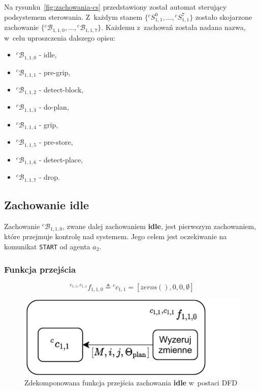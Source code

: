 Na rysunku~\ref{fig:zachowania-cs} przedstawiony został automat sterujący podsystemem sterowania. Z~każdym stanem $\{ {}^{c}S_{1,1}^0, \hdots, {}^{c}S_{1,1}^7 \}$ zostało skojarzone zachowanie $\{ {}^{c}\mathcal{B}_{1,1,0}, \hdots, {}^{c}\mathcal{B}_{1,1,7} \}$. Każdemu z~zachowań została nadana nazwa, w~celu uproszczenia dalszego opisu:
\begin{itemize}
    \item ${}^{c}\mathcal{B}_{1,1,0}$ - idle,
    \item ${}^{c}\mathcal{B}_{1,1,1}$ - pre-grip,
    \item ${}^{c}\mathcal{B}_{1,1,2}$ - detect-block,
    \item ${}^{c}\mathcal{B}_{1,1,3}$ - do-plan,
    \item ${}^{c}\mathcal{B}_{1,1,4}$ - grip,
    \item ${}^{c}\mathcal{B}_{1,1,5}$ - pre-store,
    \item ${}^{c}\mathcal{B}_{1,1,6}$ - detect-place,
    \item ${}^{c}\mathcal{B}_{1,1,7}$ - drop.
\end{itemize}

\subsection{Zachowanie idle}
\label{subsec:cs-idle}

Zachowanie ${}^{c}\mathcal{B}_{1,1,0}$, zwane dalej zachowaniem \textbf{idle}, jest pierwszym zachowaniem, które przejmuje kontrolę nad systemem. Jego celem jest oczekiwanie na komunikat \texttt{START} od agenta $a_{2}$.

\subsubsection{Funkcja przejścia}
\begin{equation}
{}^{c_{1,1}, c_{1,1}}f_{1,1,0} \triangleq {}^{c}c_{1,1} = [zeros(), 0, 0, \emptyset]  
\end{equation}

\begin{figure}[H]
    \centering
    \includegraphics[width=\columnwidth]{figures/ISR-cs-fp-idle.pdf}
    \caption{Zdekomponowana funkcja przejścia zachowania \textbf{idle} w~postaci DFD}
    \label{fig:cs-fp-idle}
\end{figure}

